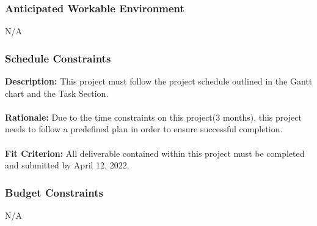\documentclass[12pt]{article}
\begin{document}
	\subsubsection{Anticipated Workable Environment}
	N/A
	\subsubsection{Schedule Constraints}
	\textbf{Description:} This project must follow the project schedule outlined in the Gantt chart and the Task Section. \\ \\ 
	\textbf{Rationale:} Due to the time constraints on this project(3 months), this project needs to follow
	a predefined plan in order to ensure successful completion. \\ \\ 
	\textbf{Fit Criterion:} All deliverable contained within this project must be completed and submitted by April 12, 2022. 
	
	\subsubsection{Budget Constraints}
	N/A
	
	
\end{document}
